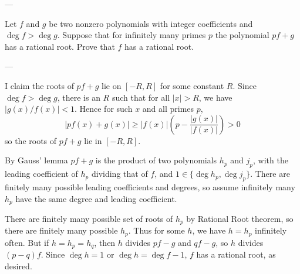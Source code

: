 
---

Let $f$ and $g$ be two nonzero polynomials with integer coefficients and $\deg f>\deg g$. Suppose that for infinitely many primes $p$ the polynomial $pf+g$ has a rational root. Prove that $f$ has a rational root.

---

I claim the roots of $pf+g$ lie on $[-R,R]$ for some constant $R$. Since $\deg f>\deg g$, there is an $R$ such that for all $|x|>R$, we have $|g(x)/f(x)|<1$. Hence for such $x$ and all primes $p$, \[|pf(x)+g(x)|\ge|f(x)|\left(p-\frac{|g(x)|}{|f(x)|}\right)>0\]
so the roots of $pf+g$ lie in $[-R,R]$.

By Gauss' lemma $pf+g$ is the product of two polynomials $h_p$ and $j_p$, with the leading coefficient of $h_p$ dividing that of $f$, and $1\in\{\deg h_p,\deg j_p\}$. There are finitely many possible leading coefficients and degrees, so assume infinitely many $h_p$ have the same degree and leading coefficient.

There are finitely many possible set of roots of $h_p$ by Rational Root theorem, so there are finitely many possible $h_p$. Thus for some $h$, we have $h=h_p$ infinitely often. But if $h=h_p=h_q$, then $h$ divides $pf-g$ and $qf-g$, so $h$ divides $(p-q)f$. Since $\deg h=1$ or $\deg h=\deg f-1$, $f$ has a rational root, as desired.

